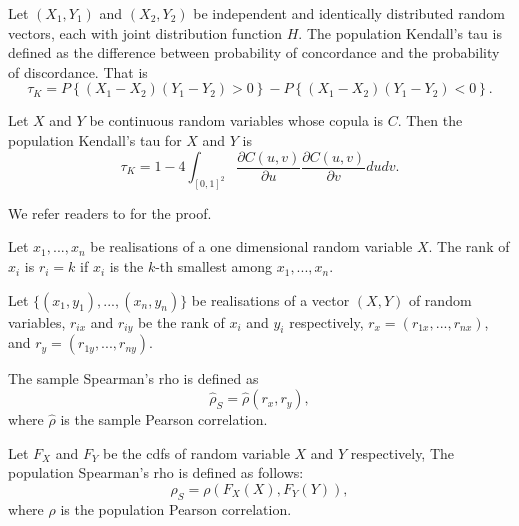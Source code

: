 \begin{defi}
  Let $(X_1, Y_1)$ and $(X_2, Y_2)$ be independent and identically distributed random vectors, each with joint distribution function $H$.
  The population Kendall's tau is defined as the difference between probability of concordance and the probability of discordance. 
  That is  
  \begin{equation*}
  \tau_K = P\left\{(X_1- X_2)(Y_1-Y_2) >0\right\} - P\left\{(X_1- X_2)(Y_1-Y_2) < 0\right\}. 
  \end{equation*}
  \end{defi}

\begin{prop}
  Let $X$ and $Y$ be continuous random variables whose copula is $C$. 
  Then the population Kendall's tau for $X$ and $Y$ is 
  \[\tau_K = 1-4\int_{[0,1]^2}
  \frac{\partial C(u,v)}{\partial u}
  \frac{\partial C(u,v)}{\partial v}
  dudv. \]
\end{prop}

We refer readers to \citet[Section 5.1.1]{Nelsen1999} for the proof. 

\begin{defi}[Rank]
  Let $x_1,...,x_n$ be realisations of a one dimensional random variable $X$. 
  The rank of $x_i$ is $r_i = k$ if $x_i$ is the $k$-th smallest among $x_1,...,x_n$.
  \end{defi}

\begin{defi}
  Let $\{(x_1, y_1),..., (x_n, y_n)\}$ be realisations of a vector $(X, Y)$ of random variables,
  $r_{ix}$ and $r_{iy}$ be the rank of $x_i$ and $y_i$ respectively, 
  $r_x = (r_{1x},..., r_{nx})$, and $r_y = (r_{1y},..., r_{ny})$. 

  The sample Spearman's rho is defined as
  \begin{equation*}
  \hat \rho_S = \hat \rho(r_x, r_y), 
  \end{equation*}
  where $\hat \rho$ is the sample Pearson correlation.
  \end{defi}

\begin{defi}
  Let $F_X$ and $F_Y$ be the cdfs of random variable $X$ and $Y$ respectively, 
  The population Spearman's rho is defined as follows:
  \begin{equation*}
  \rho_S = \rho(F_X(X), F_Y(Y)),  
  \end{equation*}
  where $\rho$ is the population Pearson correlation. 
  \end{defi}

